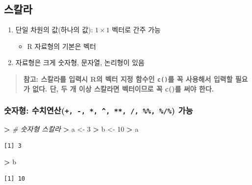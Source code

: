 \documentclass[11pt,a4paper]{book}
\newenvironment{Shaded}{\begin{snugshade}}{\end{snugshade}}
\newcommand{\DecValTok}[1]{\textcolor[rgb]{0.00,0.00,0.81}{#1}}
\newcommand{\StringTok}[1]{\textcolor[rgb]{0.31,0.60,0.02}{#1}}
\newcommand{\CommentTok}[1]{\textcolor[rgb]{0.56,0.35,0.01}{\textit{#1}}}
\newcommand{\OperatorTok}[1]{\textcolor[rgb]{0.81,0.36,0.00}{\textbf{#1}}}
\newcommand{\ErrorTok}[1]{\textcolor[rgb]{0.64,0.00,0.00}{\textbf{#1}}}
\newcommand{\NormalTok}[1]{#1}
\providecommand{\tightlist}{%
  \setlength{\itemsep}{0pt}\setlength{\parskip}{0pt}}
\theoremstyle{definition}
\theoremstyle{definition}
\theoremstyle{definition}
\theoremstyle{remark}
\begin{document}
\subsection{스칼라}

\begin{enumerate}
\def\labelenumi{\arabic{enumi}.}
\tightlist
\item
  단일 차원의 값(하나의 값): \(1 \times 1\) 벡터로 간주 가능

  \begin{itemize}
  \tightlist
  \item
    R 자료형의 기본은 벡터
  \end{itemize}
\item
  자료형은 크게 숫자형, 문자열, 논리형이 있음
\end{enumerate}

\begin{quote}
\textbf{참고: 스칼라를 입력시 R의 벡터 지정 함수인 \texttt{c()}를 꼭
사용해서 입력할 필요가 없다. 단, 두 개 이상 스칼라면 벡터이므로 꼭 c()를
써야 한다.}
\end{quote}

\subsubsection{\texorpdfstring{숫자형:
수치연산(\texttt{+,\ -,\ *,\ \^{},\ **,\ /,\ \%\%,\ \%/\%})
가능}{숫자형: 수치연산(+, -, *, \^{}, **, /, \%\%, \%/\%) 가능}}\label{----}

\footnotesize

\begin{Shaded}
\begin{Highlighting}[]
\OperatorTok{>}\StringTok{ }\CommentTok{# 숫자형 스칼라}
\ErrorTok{>}\StringTok{ }\NormalTok{a <-}\StringTok{ }\DecValTok{3}
\OperatorTok{>}\StringTok{ }\NormalTok{b <-}\StringTok{ }\DecValTok{10}
\OperatorTok{>}\StringTok{ }\NormalTok{a}
\end{Highlighting}
\end{Shaded}

\begin{verbatim}
[1] 3
\end{verbatim}

\begin{Shaded}
\begin{Highlighting}[]
\OperatorTok{>}\StringTok{ }\NormalTok{b}
\end{Highlighting}
\end{Shaded}

\begin{verbatim}
[1] 10
\end{verbatim}
\end{document}
